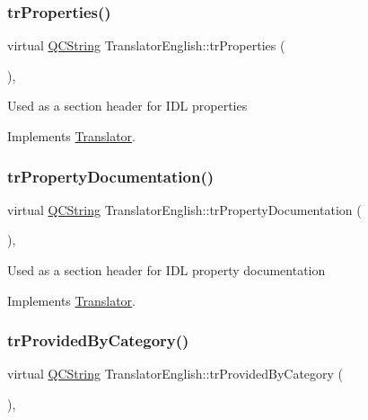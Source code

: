 \subsubsection{\texorpdfstring{trProperties()}{trProperties()}}
{\footnotesize\ttfamily virtual \mbox{\hyperlink{class_q_c_string}{Q\+C\+String}} Translator\+English\+::tr\+Properties (\begin{DoxyParamCaption}{ }\end{DoxyParamCaption})\hspace{0.3cm}{\ttfamily [inline]}, {\ttfamily [virtual]}}

Used as a section header for I\+DL properties 

Implements \mbox{\hyperlink{class_translator}{Translator}}.

\mbox{\label{class_translator_english_a8f277253d698ea7a54cb864a8b4fd79d}} 
\subsubsection{\texorpdfstring{trPropertyDocumentation()}{trPropertyDocumentation()}}
{\footnotesize\ttfamily virtual \mbox{\hyperlink{class_q_c_string}{Q\+C\+String}} Translator\+English\+::tr\+Property\+Documentation (\begin{DoxyParamCaption}{ }\end{DoxyParamCaption})\hspace{0.3cm}{\ttfamily [inline]}, {\ttfamily [virtual]}}

Used as a section header for I\+DL property documentation 

Implements \mbox{\hyperlink{class_translator}{Translator}}.

\mbox{\label{class_translator_english_a9cade208b85e2a25329548bad9489932}} 
\subsubsection{\texorpdfstring{trProvidedByCategory()}{trProvidedByCategory()}}
{\footnotesize\ttfamily virtual \mbox{\hyperlink{class_q_c_string}{Q\+C\+String}} Translator\+English\+::tr\+Provided\+By\+Category (\begin{DoxyParamCaption}{ }\end{DoxyParamCaption})\hspace{0.3cm}{\ttfamily [inline]}, {\ttfamily [virtual]}}

